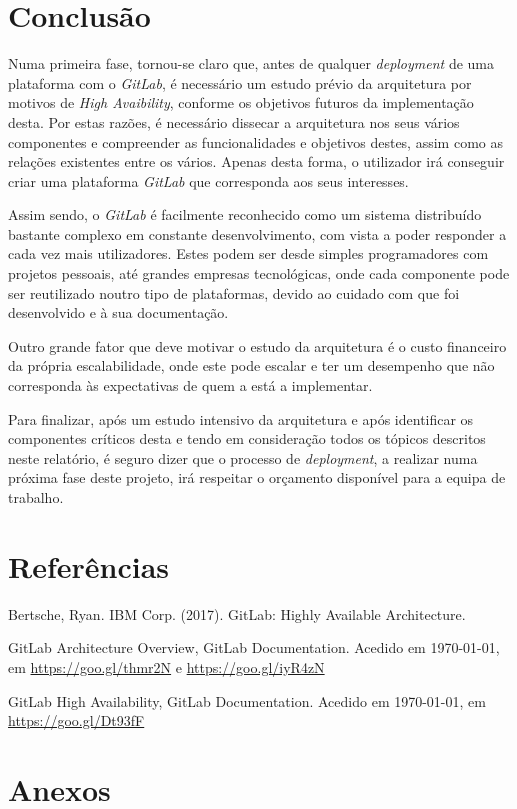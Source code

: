\documentclass[12pt,a4paper]{article}
\begin{document}
\section{Conclusão}
\par Numa primeira fase, tornou-se claro que, antes de qualquer \emph{deployment} de uma plataforma com o \emph{GitLab}, é necessário um estudo prévio da arquitetura por motivos de \emph{High Avaibility}, conforme os objetivos futuros da implementação desta. Por estas razões, é necessário dissecar a arquitetura nos seus vários componentes e compreender as funcionalidades e objetivos destes, assim como as relações existentes entre os vários. Apenas desta forma, o utilizador irá conseguir criar uma plataforma \emph{GitLab} que corresponda aos seus interesses. 
\par
Assim sendo, o \emph{GitLab} é facilmente reconhecido como um sistema distribuído bastante complexo em constante desenvolvimento, com vista a poder responder a cada vez mais utilizadores. Estes podem ser desde simples programadores com projetos pessoais, até grandes empresas tecnológicas, onde cada componente pode ser reutilizado noutro tipo de plataformas, devido ao cuidado com que foi desenvolvido e à sua documentação.
\par Outro grande fator que deve motivar o estudo da arquitetura é o custo financeiro da própria escalabilidade, onde este pode escalar e ter um desempenho que não corresponda às expectativas de quem a está a implementar.
\par Para finalizar, após um estudo intensivo da arquitetura e após identificar os componentes críticos desta e tendo em consideração todos os tópicos descritos neste relatório, é seguro dizer que o processo de \emph{deployment}, a realizar numa próxima fase deste projeto, irá respeitar o orçamento disponível para a equipa de trabalho.
 
\newpage
\section{Referências}

\vspace{1.3cm}
Bertsche, Ryan. IBM Corp. (2017). GitLab: Highly Available Architecture.

\bigbreak
GitLab Architecture Overview, GitLab Documentation. Acedido em \today, em \url{https://goo.gl/thmr2N} e \url{https://goo.gl/iyR4zN} 

\bigbreak
GitLab High Availability, GitLab Documentation. Acedido em \today, em \url{https://goo.gl/Dt93fF}


\newpage
\section{Anexos}\label{anexos}
\end{document}
